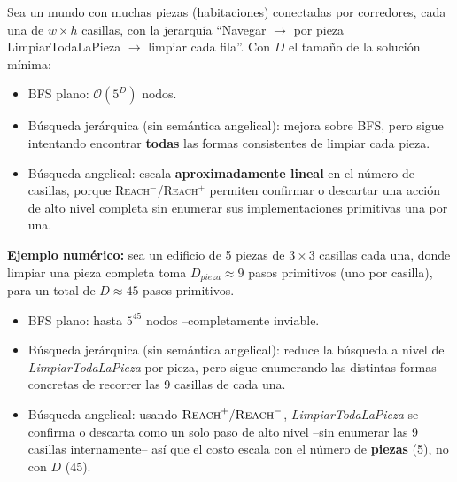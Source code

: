 \begin{example}
Sea un mundo con muchas piezas (habitaciones) conectadas por corredores, cada una de $w\times h$
casillas, con la jerarquía ``Navegar $\to$ por pieza LimpiarTodaLaPieza $\to$ limpiar cada fila''.
Con $D$ el tamaño de la solución mínima:
\begin{itemize}
    \item BFS plano: $\mathcal{O}(5^D)$ nodos.
    \item Búsqueda jerárquica (sin semántica angelical): mejora sobre BFS, pero sigue intentando
    encontrar \textbf{todas} las formas consistentes de limpiar cada pieza.
    \item Búsqueda angelical: escala \textbf{aproximadamente lineal} en el número de casillas, porque
    \textsc{Reach}$^-$/\textsc{Reach}$^+$ permiten confirmar o descartar una acción de alto nivel
    completa sin enumerar sus implementaciones primitivas una por una.
\end{itemize}

\textbf{Ejemplo numérico:} sea un edificio de 5 piezas de $3\times 3$ casillas cada una, donde
limpiar una pieza completa toma $D_{pieza}\approx 9$ pasos primitivos (uno por casilla), para un
total de $D\approx 45$ pasos primitivos.
\begin{itemize}
    \item BFS plano: hasta $5^{45}$ nodos --completamente inviable.
    \item Búsqueda jerárquica (sin semántica angelical): reduce la búsqueda a nivel de
    \textit{LimpiarTodaLaPieza} por pieza, pero sigue enumerando las distintas formas concretas de
    recorrer las 9 casillas de cada una.
    \item Búsqueda angelical: usando $\textsc{Reach}^+/\textsc{Reach}^-$, \textit{LimpiarTodaLaPieza}
    se confirma o descarta como un solo paso de alto nivel --sin enumerar las 9 casillas
    internamente-- así que el costo escala con el número de \textbf{piezas} (5), no con $D$ (45).
\end{itemize}
\end{example}
